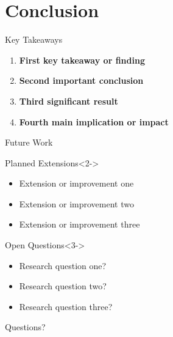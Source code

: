 \documentclass[aspectratio=169]{beamer}
\begin{document}
\section{Conclusion}

\begin{frame}{Key Takeaways}
    \begin{enumerate}
        \item<1-> \textbf<1>{First key takeaway or finding}
        \item<2-> \textbf<2>{Second important conclusion}
        \item<3-> \textbf<3>{Third significant result}
        \item<4-> \textbf<4>{Fourth main implication or impact}
    \end{enumerate}
    
    \vspace{2em}
    
\end{frame}

\begin{frame}{Future Work}
    
    \begin{block}{Planned Extensions}<2->
        \begin{itemize}
            \item Extension or improvement one
            \item Extension or improvement two
            \item Extension or improvement three
        \end{itemize}
    \end{block}
    
    \begin{block}{Open Questions}<3->
        \begin{itemize}
            \item Research question one?
            \item Research question two?
            \item Research question three?
        \end{itemize}
    \end{block}
\end{frame}

\begin{frame}[plain]
    \begin{center}
        {\Huge Questions?}
        
        \vspace{2em}
        
    \end{center}
\end{frame}
\end{document}
